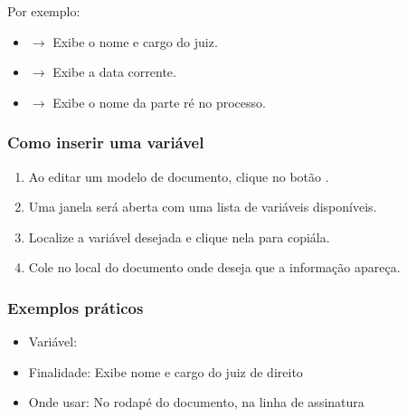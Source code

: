 \documentclass[letterpaper,10pt,brazil]{sphinxmanual}
\begin{document}
\sphinxAtStartPar
Por exemplo:
\begin{itemize}
\item {} 
\sphinxAtStartPar
{} \(\rightarrow\) Exibe o nome e cargo do juiz.

\item {} 
\sphinxAtStartPar
{} \(\rightarrow\) Exibe a data corrente.

\item {} 
\sphinxAtStartPar
{} \(\rightarrow\) Exibe o nome da parte ré no processo.

\end{itemize}


\subsubsection{Como inserir uma variável}
\label{\detokenize{projud_49_variaveis:como-inserir-uma-variavel}}\begin{enumerate}
%
\item {} 
\sphinxAtStartPar
Ao editar um modelo de documento, clique no botão .

\item {} 
\sphinxAtStartPar
Uma janela será aberta com uma lista de variáveis disponíveis.

\item {} 
\sphinxAtStartPar
Localize a variável desejada e clique nela para copiá\sphinxhyphen{}la.

\item {} 
\sphinxAtStartPar
Cole no local do documento onde deseja que a informação apareça.

\end{enumerate}


\subsubsection{Exemplos práticos}
\label{\detokenize{projud_49_variaveis:exemplos-praticos}}
\sphinxAtStartPar
{}
\begin{itemize}
\item {} 
\sphinxAtStartPar
Variável: 

\item {} 
\sphinxAtStartPar
Finalidade: Exibe nome e cargo do juiz de direito

\item {} 
\sphinxAtStartPar
Onde usar: No rodapé do documento, na linha de assinatura

\end{itemize}
\end{document}
